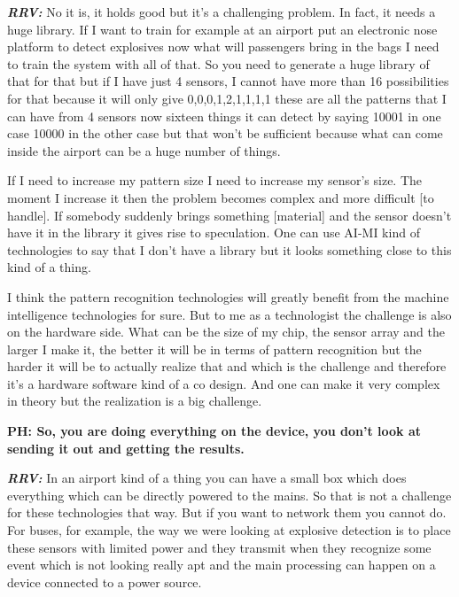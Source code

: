 \begin{multicols}{2}
\textbf{\textit{RRV:}} No it is, it holds good but it’s a challenging problem. In fact, it needs a huge library. If I want to train for example at an airport put an electronic nose platform to detect explosives now what will passengers bring in the bags I need to train the system with all of that. So you need to generate a huge library of that for that but if I have just 4 sensors, I cannot have more than 16 possibilities for that because it will only give 0,0,0,1,2,1,1,1,1 these are all the patterns that I can have from 4 sensors now sixteen things it can detect by saying 10001 in one case 10000 in the other case but that won’t be sufficient because what can come inside the airport can be a huge number of things. 

If I need to increase my pattern size I need to increase my sensor’s size. The moment I increase it then the problem becomes complex and more difficult [to handle]. If somebody suddenly brings something [material] and the sensor doesn’t have it in the library it gives rise to speculation. One can use AI-MI kind of technologies to say that I don’t have a library but it looks something close to this kind of a thing.

I think the pattern recognition technologies will greatly benefit from the machine intelligence technologies for sure. But to me as a technologist the challenge is also on the hardware side. What can be the size of my chip, the sensor array and the larger I make it, the better it will be in terms of pattern recognition but the harder it will be to actually realize that and which is the challenge and therefore it’s a hardware software kind of a co design. And one can make it very complex in theory but the realization is a big challenge.

\textbf{PH: So, you are doing everything on the device, you don’t look at sending it out and getting the results.}

\textbf{\textit{RRV:}} In an airport kind of a thing you can have a small box which does everything which can be directly powered to the mains. So that is not a challenge for these technologies that way. But if you want to network them you cannot do. For buses, for example, the way we were looking at explosive detection is to place these sensors with limited power and they transmit when they recognize some event which is not looking really apt and the main processing can happen on a device connected to a power source.

\vskip -0.2cm


\end{multicols}
